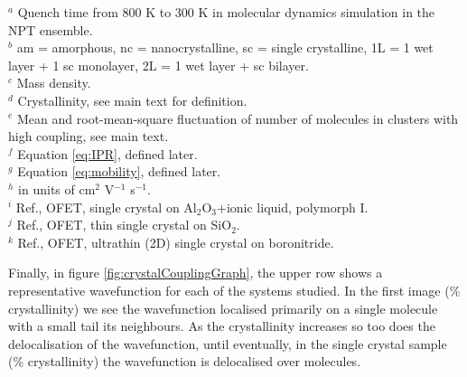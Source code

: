 $^a$ Quench time from 800 K to 300 K in molecular dynamics simulation in the NPT ensemble. \\
$^b$ am = amorphous, nc = nanocrystalline, sc = single crystalline, 1L = 1 wet layer + 1 sc monolayer, 2L = 1 wet layer + sc bilayer. \\
$^c$ Mass density. \\
$^d$ Crystallinity, see main text for definition. \\
$^e$ Mean and root-mean-square fluctuation of number of molecules in clusters with high coupling, see main text. \\
$^f$ Equation \eqref{eq:IPR}, defined later.  \\
$^g$ Equation \eqref{eq:mobility}, defined later. \\
$^h$ in units of cm$^2$ V$^{-1}$ s$^{-1}$. \\
$^i$ Ref.\cite{Takeyama2012_PentCryst}, OFET, single crystal on Al$_2$O$_3$+ionic liquid, polymorph I. \\
$^j$ Ref.\cite{Arabi2016}, OFET, thin single crystal on SiO$_2$. \\
$^k$ Ref.\cite{Zhang2016TF}, OFET, ultrathin (2D) single crystal on boronitride.

Finally, in figure \ref{fig:crystalCouplingGraph}, the upper row shows a representative wavefunction for each of the systems studied. In the first image (\% crystallinity) we see the wavefunction localised primarily on a single molecule with a small tail its neighbours. As the crystallinity increases so too does the delocalisation of the wavefunction, until eventually, in the single crystal sample (\% crystallinity) the wavefunction is delocalised over  molecules.

